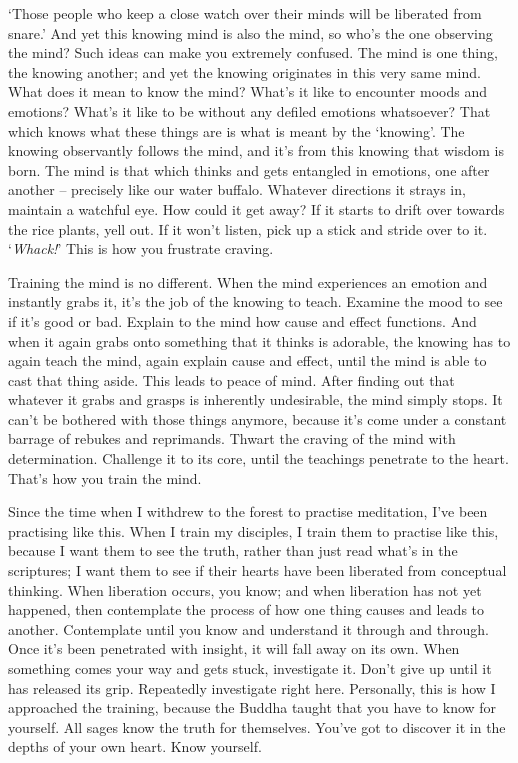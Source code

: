 `Those people who keep a close watch over their minds will be liberated from  snare.' And yet this knowing mind is also the mind, so who's the one observing the mind? Such ideas can make you extremely confused. The mind is one thing, the knowing another; and yet the knowing originates in this very same mind. What does it mean to know the mind? What's it like to encounter moods and emotions? What's it like to be without any defiled emotions whatsoever? That which knows what these things are is what is meant by the `knowing'. The knowing observantly follows the mind, and it's from this knowing that wisdom is born. The mind is that which thinks and gets entangled in emotions, one after another -- precisely like our water buffalo. Whatever directions it strays in, maintain a watchful eye. How could it get away? If it starts to drift over towards the rice plants, yell out. If it won't listen, pick up a stick and stride over to it. `\textit{Whack!}' This is how you frustrate craving.

Training the mind is no different. When the mind experiences an emotion and instantly grabs it, it's the job of the knowing to teach. Examine the mood to see if it's good or bad. Explain to the mind how cause and effect functions. And when it again grabs onto something that it thinks is adorable, the knowing has to again teach the mind, again explain cause and effect, until the mind is able to cast that thing aside. This leads to peace of mind. After finding out that whatever it grabs and grasps is inherently undesirable, the mind simply stops. It can't be bothered with those things anymore, because it's come under a constant barrage of rebukes and reprimands. Thwart the craving of the mind with determination. Challenge it to its core, until the teachings penetrate to the heart. That's how you train the mind.

Since the time when I withdrew to the forest to practise meditation, I've been practising like this. When I train my disciples, I train them to practise like this, because I want them to see the truth, rather than just read what's in the scriptures; I want them to see if their hearts have been liberated from conceptual thinking. When liberation occurs, you know; and when liberation has not yet happened, then contemplate the process of how one thing causes and leads to another. Contemplate until you know and understand it through and through. Once it's been penetrated with insight, it will fall away on its own. When something comes your way and gets stuck, investigate it. Don't give up until it has released its grip. Repeatedly investigate right here. Personally, this is how I approached the training, because the Buddha taught that you have to know for yourself. All sages know the truth for themselves. You've got to discover it in the depths of your own heart. Know yourself.

